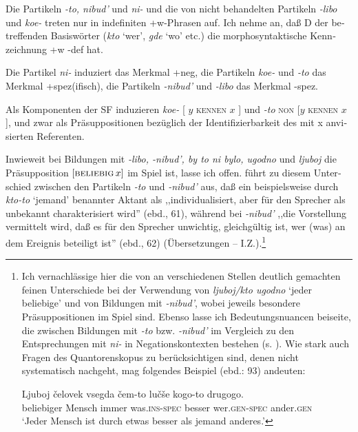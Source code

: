 \documentclass[output=paper, colorlinks, citecolor=brown, booklanguage=german]{langscibook}
\begin{document}
\begin{otherlanguage}{german}
\ea Die Partikeln \textit{-to, nibud'} und \textit{ni-} und die von \citet{Seliverstova1988} nicht behandelten Partikeln \textit{-libo} und \textit{koe-} treten nur in indefiniten +w-Phrasen auf. Ich nehme an, daß D der betreffenden Basiswörter (\textit{kto} `wer', \textit{gde} `wo' etc.) die morphosyntaktische Kennzeichnung +w -def hat.
\z 

\ea Die Partikel \textit{ni-} induziert das Merkmal +neg, die Partikeln \textit{koe-} und \textit{-to} das Merkmal +spez(ifisch), die Partikeln \textit{-nibud'} und \textit{-libo} das Merkmal -spez.
\z 

\ea\label{ex:02:komponenten-sf} Als Komponenten der SF induzieren \textit{koe-} [ $y$ \textsc{kennen} $x$ ] und \textit{-to} \textsc{non} [$y$ \textsc{kennen} $x$ ], und zwar als Präsuppositionen bezüglich der Identifizierbarkeit des mit x anvisierten Referenten.
\z 

\noindent Inwieweit bei Bildungen mit \textit{-libo, -nibud', by to ni bylo, ugodno} und \textit{ljuboj} die Präsupposition $[\textsc{beliebig}\, x]$ im Spiel ist, lasse ich offen.
\citet[60ff., 74f.]{Seliverstova1988} führt zu diesem Unterschied zwischen den Partikeln \textit{-to} und \textit{-nibud'} aus, daß ein beispielsweise durch
\textit{kto-to} `jemand' benannter Aktant als ,,individualisiert, aber für den Sprecher als unbekannt charakterisiert wird'' (ebd., 61), während bei \textit{-nibud'} ,,die Vorstellung vermittelt wird, daß es für den Sprecher unwichtig, gleichgültig ist, wer (was) an dem Ereignis beteiligt ist'' (ebd., 62) (Übersetzungen -- I.Z.).\footnote{Ich vernachlässige hier die von \citet{Seliverstova1988} an verschiedenen Stellen deutlich gemachten feinen Unterschiede bei der Verwendung von \textit{ljuboj/kto ugodno} `jeder beliebige' und von Bildungen mit \textit{-nibud'}, wobei jeweils besondere Präsuppositionen im Spiel sind. Ebenso lasse ich Bedeutungsnuancen beiseite, die zwischen Bildungen mit \textit{-to} bzw. \textit{-nibud'} im Ver\-gleich zu den Entsprechungen mit \textit{ni-} in Negationskontexten bestehen (s. \citealt[97ff.]{Seliverstova1988}). Wie stark auch Fragen des Quantorenskopus zu berücksichtigen sind, denen \citeauthor{Seliverstova1988} nicht systematisch nachgeht, mag folgendes Beispiel (ebd.: 93) andeuten:

\ea
\gll Ljuboj čelovek vsegda čem-to lučše kogo-to drugogo.\\
beliebiger Mensch immer was.\textsc{ins}-\textsc{spec} besser wer.\textsc{gen}-\textsc{spec} ander.\textsc{gen} \\
\glt ‘Jeder Mensch ist durch etwas besser als jemand anderes.’
\z 
}


\end{otherlanguage}
\end{document}
